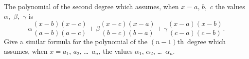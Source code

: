 The polynomial of the second degree which assumes, when $x = a$, $b$,~$c$
the values $\alpha$,~$\beta$,~$\gamma$ is
\[
\alpha\frac{(x - b)(x - c)}{(a - b)(a - c)} +
\beta \frac{(x - c)(x - a)}{(b - c)(b - a)} +
\gamma\frac{(x - a)(x - b)}{(c - a)(c - b)}.
\]
Give a similar formula for the polynomial of the $(n - 1)$th~degree which
assumes, when $x = a_{1}$, $a_{2}$, \dots~$a_{n}$, the values $\alpha_{1}$, $\alpha_{2}$, \dots~$\alpha_{n}$.
